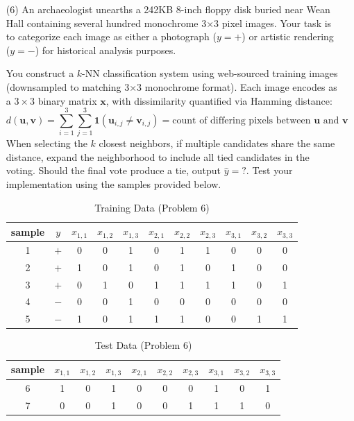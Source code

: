 \documentclass[11pt,addpoints,answers]{exam}
\newcommand{\xv}{\mathbf{x}}
\newcommand{\vv}{\mathbf{v}}
\newcommand{\uv}{\mathbf{u}}
\begin{document}
\begin{enumerate}[label=\alph*), itemsep=10pt]
		\clearpage
		
		\item[(6)] An archaeologist unearths a 242KB 8-inch floppy disk buried near Wean Hall containing several hundred monochrome 3×3 pixel images. Your task is to categorize each image as either a photograph ($y=+$) or artistic rendering ($y=-$) for historical analysis purposes. 
		
		You construct a $k$-NN classification system using web-sourced training images (downsampled to matching 3×3 monochrome format). Each image encodes as a $3 \times 3$ binary matrix $\xv$, with dissimilarity quantified via Hamming distance: 
		$$d(\uv, \mathbf{v}) = \sum_{i=1}^3 \sum_{j=1}^3 \mathbf{1}(\uv_{i,j} \neq \vv_{i,j}) = \text{count of differing pixels between } \uv \text{ and } \vv$$
		When selecting the $k$ closest neighbors, if multiple candidates share the same distance, expand the neighborhood to include all tied candidates in the voting. Should the final vote produce a tie, output $\hat{y}=?$. 
		Test your implementation using the samples provided below.
		
		\begin{table}[H]
			\centering
			\begin{tabular}{ccccccccccc}
				\toprule
				sample & $y$ & $x_{1,1}$ & $x_{1,2}$ & $x_{1,3}$ & $x_{2,1}$ & $x_{2,2}$ & $x_{2,3}$ & $x_{3,1}$ & $x_{3,2}$ & $x_{3,3}$  \\
				\midrule
				1 & $+$ & 0 & 0 & 1 & 0 & 1 & 1 & 0 & 0 & 0 \\
				2 & $+$ & 1 & 0 & 1 & 0 & 1 & 0 & 1 & 0 & 0 \\
				3 & $+$ & 0 & 1 & 0 & 1 & 1 & 1 & 1 & 0 & 1 \\
				4 & $-$ & 0 & 0 & 1 & 0 & 0 & 0 & 0 & 0 & 0 \\
				5 & $-$ & 1 & 0 & 1 & 1 & 1 & 0 & 0 & 1 & 1 \\
				\bottomrule
			\end{tabular}
			\caption{Training Data (Problem 6)} \label{tab:knn6_train_img}  %
		\end{table}
		
		\begin{table}[H]
			\centering
			\begin{tabular}{cccccccccc}
				\toprule
				sample & $x_{1,1}$ & $x_{1,2}$ & $x_{1,3}$ & $x_{2,1}$ & $x_{2,2}$ & $x_{2,3}$ & $x_{3,1}$ & $x_{3,2}$ & $x_{3,3}$  \\
				\midrule
				6 & 1 & 0 & 1 & 0 & 0 & 0 & 1 & 0 & 1 \\
				7 & 0 & 0 & 1 & 0 & 0 & 1 & 1 & 1 & 0 \\
				\bottomrule
			\end{tabular}
			\caption{Test Data (Problem 6)} \label{tab:knn6_test_img}  %
		\end{table}
		

\end{enumerate}
\end{document}
